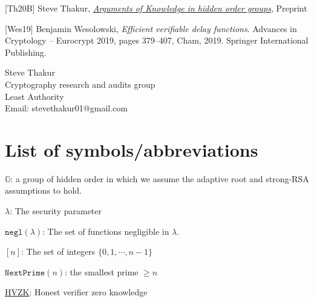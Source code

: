 \documentclass[11pt, lettersize, notitlepage, leqno, footskip=0.6cm]{article}
\newcommand{\ttt}{\texttt}
\newcommand{\negl}{\ttt{{negl}}}
\newcommand{\mb}{\mathbb}
\newcommand{\lam}{\lambda}
\newcommand{\noin}{\noindent}
\numberwithin{equation}{section}
\begin{document}
{{{\noin \hypertarget{Th20}{[Th20B]} Steve Thakur, \href{https://eprint.iacr.org/2020/1617}{\textit{Arguments of Knowledge in hidden order groups}}, Preprint \vspace{0.1cm} 


\noin \hypertarget{Wes18}{[Wes19]} Benjamin Wesolowski, \textit{Efficient verifiable delay functions}. Advances in Cryptology – Eurocrypt 2019, pages 379–407, Cham, 2019. Springer International Publishing.\vspace{0.1cm}




\bigskip

\normalsize

\noin Steve Thakur\\
Cryptography research and audits group\\
Least Authority\\

\noin Email: stevethakur01@gmail.com 


\newpage

\appendix

\section{\fontsize{11}{11}\selectfont List of symbols/abbreviations  }

\noin $\mb{G}$: a group of hidden order in which we assume the adaptive root and strong-RSA assumptions to hold. \vspace{0.1cm}

\noin $\lam$: The security parameter \vspace{0.1cm}

\noin $\negl(\lam)$: The set of functions negligible in $\lam$. \vspace{0.1cm}

\noin $[n]$: The set of integers $\{0,1,\cdots,n-1 \}$ \vspace{0.1cm}

\noin $\ttt{NextPrime}(n)$: the smallest prime $\geq n$ \vspace{0.1cm}

\noin \hyperlink{HVZK}{HVZK}: Honest verifier zero knowledge \vspace{0.1cm}

}}}
\end{document}
